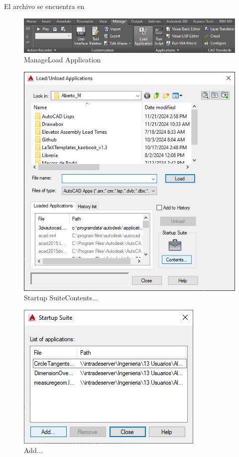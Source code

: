 \documentclass[12pt,letterpaper,final]{report}
\begin{document}
El archivo se encuentra en 

\begin{figure}[H]
	\centering
	\includegraphics[width=0.95\linewidth, height=0.5\textheight,keepaspectratio]{Imagenes/autocad_measuregeom01}
	\caption{Manage\textrightarrow Load Application}
	\label{fig:autocadmeasuregeom01}
\end{figure}

\begin{figure}[H]
	\centering
	\includegraphics[width=0.85\linewidth, height=0.5\textheight,keepaspectratio]{Imagenes/autocad_measuregeom02}
	\caption{Startup Suite\textrightarrow Contents...}
	\label{fig:autocadmeasuregeom02}
\end{figure}

\begin{figure}[H]
	\centering
	\includegraphics[width=0.65\linewidth, height=0.5\textheight,keepaspectratio]{Imagenes/autocad_measuregeom03}
	\caption{Add...}
	\label{fig:autocadmeasuregeom03}
\end{figure}
\end{document}
